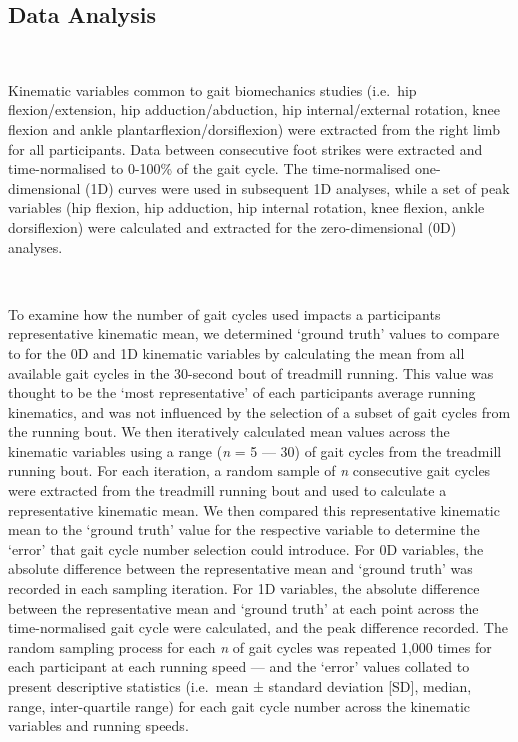 \documentclass[]{elsarticle} %
\begin{document}
\hypertarget{data-analysis}{%
\subsection{Data Analysis}\label{data-analysis}}

~

Kinematic variables common to gait biomechanics studies (i.e.~hip
flexion/extension, hip adduction/abduction, hip internal/external
rotation, knee flexion and ankle plantarflexion/dorsiflexion) were
extracted from the right limb for all participants. Data between
consecutive foot strikes were extracted and time-normalised to 0-100\%
of the gait cycle. The time-normalised one-dimensional (1D) curves were
used in subsequent 1D analyses, while a set of peak variables (hip
flexion, hip adduction, hip internal rotation, knee flexion, ankle
dorsiflexion) were calculated and extracted for the zero-dimensional
(0D) analyses.

~

To examine how the number of gait cycles used impacts a participants
representative kinematic mean, we determined `ground truth' values to
compare to for the 0D and 1D kinematic variables by calculating the mean
from all available gait cycles in the 30-second bout of treadmill
running. This value was thought to be the `most representative' of each
participants average running kinematics, and was not influenced by the
selection of a subset of gait cycles from the running bout. We then
iteratively calculated mean values across the kinematic variables using
a range (\emph{n} = 5 --- 30) of gait cycles from the treadmill running
bout. For each iteration, a random sample of \emph{n} consecutive gait
cycles were extracted from the treadmill running bout and used to
calculate a representative kinematic mean. We then compared this
representative kinematic mean to the `ground truth' value for the
respective variable to determine the `error' that gait cycle number
selection could introduce. For 0D variables, the absolute difference
between the representative mean and `ground truth' was recorded in each
sampling iteration. For 1D variables, the absolute difference between
the representative mean and `ground truth' at each point across the
time-normalised gait cycle were calculated, and the peak difference
recorded. The random sampling process for each \emph{n} of gait cycles
was repeated 1,000 times for each participant at each running speed ---
and the `error' values collated to present descriptive statistics
(i.e.~mean ± standard deviation {[}SD{]}, median, range, inter-quartile
range) for each gait cycle number across the kinematic variables and
running speeds.
\end{document}
